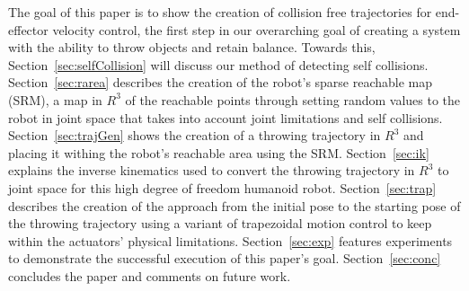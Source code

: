 
The goal of this paper is to show the creation of collision free trajectories for end-effector velocity control, the first step in our overarching goal of creating a system with the ability to throw objects and retain balance.  Towards this, Section~\ref{sec:selfCollision} will discuss our method of detecting self collisions.  Section~\ref{sec:rarea} describes the creation of the robot's sparse reachable map (SRM), a map in $R^3$ of the reachable points through setting random values to the robot in joint space that takes into account joint limitations and self collisions.  Section~\ref{sec:trajGen} shows the creation of a throwing trajectory in $R^3$ and placing it withing the robot's reachable area using the SRM.  Section~\ref{sec:ik} explains the inverse kinematics used to convert the throwing trajectory in $R^3$ to joint space for this high degree of freedom humanoid robot.  Section~\ref{sec:trap} describes the creation of the approach from the initial pose to the starting pose of the throwing trajectory using a variant of trapezoidal motion control to keep within the actuators' physical limitations.  Section~\ref{sec:exp} features experiments to demonstrate the successful execution of this paper's goal.  Section~\ref{sec:conc} concludes the paper and comments on future work.